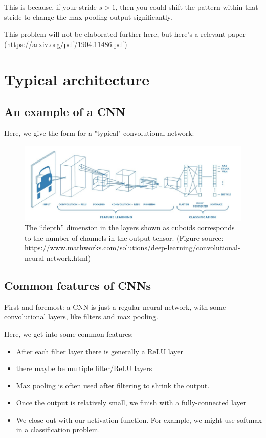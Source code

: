         This is because, if your stride $s>1$, then you could shift the pattern within that stride to change the max pooling output significantly.
        
        This problem will not be elaborated further here, but here's a relevant paper (https://arxiv.org/pdf/1904.11486.pdf)




\section{Typical architecture}

    \subsection{An example of a CNN}
    
        Here, we give the form for a "typical" convolutional network:
        
        \begin{figure}[H]
            \includegraphics[width=\textwidth]{images/convolutional_neural_networks_images/Architecture.png}
            
            \caption*{The ``depth'' dimension in the layers shown as cuboids corresponds to the number of channels in the output tensor. (Figure source: https://www.mathworks.com/solutions/deep-learning/convolutional-neural-network.html)}
        \end{figure}
        
    
    \subsection{Common features of CNNs}
        
        First and foremost: a CNN is just a regular neural network, with some convolutional layers, like filters and max pooling.
        
        Here, we get into some common features:
        
        \begin{itemize}
            \item After each filter layer there is generally a ReLU layer
            \item there maybe be multiple filter/ReLU layers
            \item Max pooling is often used after filtering to shrink the output.
            \item Once the output is relatively small, we finish with a fully-connected layer
            \item We close out with our activation function. For example, we might use softmax in a classification problem.
        \end{itemize}
        
